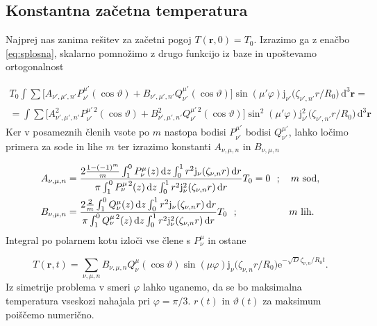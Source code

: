 \documentclass{article}
\def\phi{\varphi}
\def\theta{\vartheta}
\newcommand{\dd}{\,\mathrm{d}}
\newcommand{\vect}[1]{\boldsymbol{#1}}
\begin{document}
\subsection{Konstantna začetna temperatura}


Najprej nas zanima rešitev za začetni pogoj $T(\vect r, 0) = T_0$.
Izrazimo ga z enačbo \ref{eq:splosna}, skalarno pomnožimo z drugo funkcijo iz baze in upoštevamo ortogonalnost

\begin{equation}
\begin{split}
T_0\int \sum \Big[A_{\nu', \mu', n'} P_{\nu'}^{\mu'}(\cos \theta) + B_{\nu', \mu', n'} Q_{\nu'}^{\mu'}(\cos \theta) \Big]
	\sin(\mu' \phi) \mathrm{j}_{\nu'} \big(\zeta_{\nu', n'} r/R_0\big) \dd ^3 \vect r = \\	
	 = \int \sum \Big[A_{\nu', \mu', n'}^2 P_{\nu'}^{\mu' \, 2}(\cos \theta) + B_{\nu', \mu', n'}^2 Q_{\nu'}^{\mu' \, 2}(\cos \theta) \Big]
	\sin^2(\mu' \phi) \mathrm{j}_{\nu'}^2 \big(\zeta_{\nu', n'} r/R_0\big) \dd ^3 \vect r
\end{split}
\end{equation}
Ker v posameznih členih vsote po $m$ nastopa bodisi $P_{\nu'}^{\mu'}$ bodisi $Q_{\nu'}^{\mu'}$, lahko ločimo primera za sode in lihe $m$ ter izrazimo konstanti $A_{\nu, \mu, n}$ in $B_{\nu, \mu, n}$

\begin{equation}
\begin{split}
A_{\nu, \mu, n} &= \frac{2\frac{1-(-1)^m}{m} \int_1^0 P_{\nu}^{\mu}(z) \dd z\int_0^1 r^2 \mathrm{j}_\nu (\zeta_{\nu,n} r) \dd r}
	{\pi  \int_1^0 P_{\nu}^{\mu \, 2}(z) \dd z\int_0^1 r^2 \mathrm{j}_\nu^2 (\zeta_{\nu,n} r) \dd r}T_0 =0  \ \ ; \quad m \text{ sod}, \\
B_{\nu, \mu, n} &= \frac{2\frac{2}{m} \int_1^0 Q_{\nu}^{\mu}(z) \dd z\int_0^1 r^2 \mathrm{j}_\nu (\zeta_{\nu,n} r) \dd r}
	{\pi  \int_1^0 Q_{\nu}^{\mu \, 2}(z) \dd z\int_0^1 r^2 \mathrm{j}_\nu^2 (\zeta_{\nu,n} r) \dd r}T_0 \ \ ; \hspace{15mm} \quad m \text{ lih}.
\end{split}
\end{equation}
Integral po polarnem kotu izloči vse člene s $P_{\nu}^\mu$ in ostane

\begin{equation}
T(\vect r, t) = \sum_{\nu, \mu, n}  B_{\nu, \mu, n} Q_\nu^\mu(\cos \theta)
	\sin(\mu \phi) \mathrm{j}_\nu \big(\zeta_{\nu, n} r/R_0\big)
	\mathrm{e}^{-\sqrt{D} \zeta_{\nu, n}/R_0 t}.
\end{equation}
Iz simetrije problema v smeri $\phi$ lahko uganemo, da se bo maksimalna temperatura vseskozi nahajala pri $\phi = \pi/3$.
$r(t)$ in $\theta(t)$ za maksimum poiščemo numerično.
\end{document}
